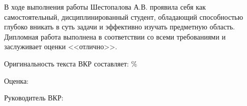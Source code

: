 \documentclass[12pt, a4paper, titlepage]{extarticle}
\begin{document}
	В ходе выполнения работы Шестопалова А.В. проявила себя как самостоятельный, дисциплинированный студент, обладающий способностью глубоко вникать в суть задачи и эффективно изучать предметную область. Дипломная работа выполнена в соответствии со всеми требованиями и заслуживает оценки <<отлично>>.

	\vspace{20pt}

	\noindent Оригинальность текста ВКР составляет: \underline{}\%

	\noindent Оценка: \underline{}

	\noindent Руководитель ВКР:  \signature{\hspace{80pt}} \hspace{30pt} 

	\vspace{10pt}
	\noindent{}
\end{document}
